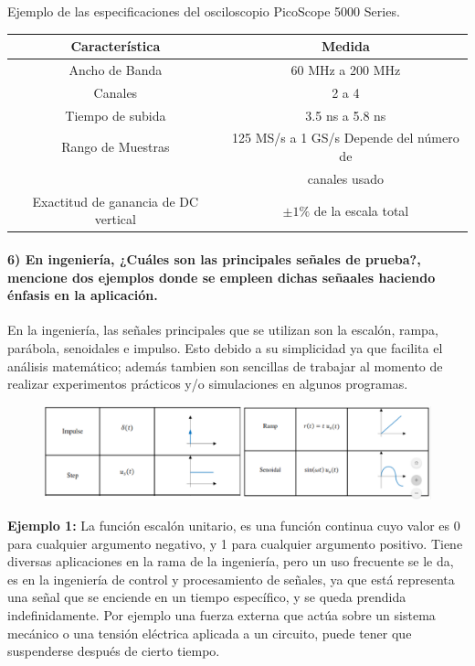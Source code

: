 Ejemplo de las especificaciones del osciloscopio PicoScope 5000 Series.
\newline
\begin{center}
	\begin{table}[htbp]
		\centering
		\begin{tabular}{|c|c|}
			\hline
			\textbf{Característica} & 					\textbf{Medida}\\	\hline
			Ancho de Banda & 60 MHz a 200 MHz \\ \hline
			Canales & 2 a 4 \\ \hline
			Tiempo de subida & 3.5 ns a 5.8 ns \\ \hline
			Rango de Muestras & 125 MS/s a 1 GS/s Depende del número de \\ & canales usado \\ \hline
			Exactitud de ganancia de DC vertical & $\pm 1\%$ de la escala total \\ \hline
		\end{tabular}
		\newline 
	\end{table}
\end{center}

\paragraph{6) En ingeniería, ¿Cuáles son las principales señales de prueba?,\\ mencione dos ejemplos donde se empleen dichas señaales haciendo énfasis en la aplicación.} 

En la ingeniería, las señales principales que se utilizan son la escalón, rampa, parábola, senoidales e impulso. Esto debido a su simplicidad ya que facilita el análisis matemático; además tambien son sencillas de trabajar al momento de realizar experimentos prácticos y/o simulaciones en algunos programas.

\begin{figure}[h]
	\includegraphics[scale=0.33]{sen}
	\centering
\end{figure}

\textbf{Ejemplo 1:}
La función escalón unitario, es una función continua cuyo valor es 0 para cualquier argumento negativo, y 1 para cualquier argumento positivo. Tiene diversas aplicaciones en la rama de la ingeniería, pero un uso frecuente se le da, es en la ingeniería de control y procesamiento de señales, ya que está representa una señal que se enciende en un tiempo específico, y se queda prendida indefinidamente. Por ejemplo una fuerza externa que actúa sobre un sistema mecánico o una tensión eléctrica aplicada a un circuito, puede tener que suspenderse después de cierto tiempo. \\


